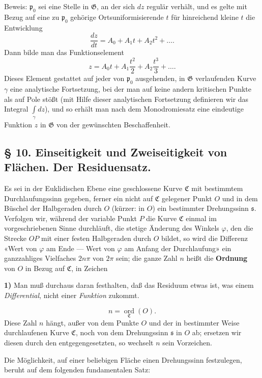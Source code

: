 \documentclass{article}
\begin{document}
Beweis: $\mathfrak{p}_0$ sei eine Stelle in $\mathfrak{G}$, an der sich $dz$ regulär verhält, und es gelte mit Bezug auf eine zu $\mathfrak{p}_0$ gehörige Ortsuniformisierende $t$ für hinreichend kleine $t$ die Entwicklung
\[ \frac{dz}{dt} = A_0 + A_1 t + A_2 t^2 + \dots. \]
Dann bilde man das Funktionselement
\[ z = A_0 t + A_1 \frac{t^2}{2} + A_2 \frac{t^3}{3} + \dots. \]
Dieses Element gestattet auf jeder von $\mathfrak{p}_0$ ausgehenden, in $\mathfrak{G}$ verlaufenden Kurve $\gamma$ eine analytische Fortsetzung, bei der man auf keine andern kritischen Punkte als auf Pole stößt (mit Hilfe dieser analytischen Fortsetzung definieren wir das Integral $\displaystyle\int\limits_\gamma dz$), und so erhält man nach dem Monodromiesatz eine eindeutige Funktion $z$ in $\mathfrak{G}$ von der gewünschten Beschaffenheit.

\subsection*{§ 10. Einseitigkeit und Zweiseitigkeit von Flächen. Der Residuensatz.}

Es sei in der Euklidischen Ebene eine geschlossene Kurve $\mathfrak{C}$ mit bestimmtem Durchlaufungssinn gegeben, ferner ein nicht auf $\mathfrak{C}$ gelegener Punkt $O$ und in dem Büschel der Halbgeraden durch $O$ (kürzer: in $O$) ein bestimmter Drehungssinn $\mathfrak{s}$. Verfolgen wir, während der variable Punkt $P$ die Kurve $\mathfrak{C}$ einmal im vorgeschriebenen Sinne durchläuft, die stetige Änderung des Winkels $\varphi$, den die Strecke $OP$ mit einer festen Halbgeraden durch $O$ bildet, so wird die Differenz
«Wert von $\varphi$ am Ende --- Wert von $\varphi$ am Anfang der Durchlaufung»
ein ganzzahliges Vielfaches $2n\pi$ von $2\pi$ sein; die ganze Zahl $n$ heißt die \textbf{Ordnung} von $O$ in Bezug auf $\mathfrak{C}$, in Zeichen

\textbf{1)} Man muß durchaus daran festhalten, daß das Residuum etwas ist, was einem \emph{Differential}, nicht einer \emph{Funktion} zukommt.

\[ n = \underset{\mathfrak{C}}{\operatorname{ord}}(O). \]
Diese Zahl $n$ hängt, außer von dem Punkte $O$ und der in bestimmter Weise durchlaufenen Kurve $\mathfrak{C}$, noch von dem Drehungssinn $\mathfrak{s}$ in $O$ ab; ersetzen wir diesen durch den entgegengesetzten, so wechselt $n$ sein Vorzeichen.

Die Möglichkeit, auf einer beliebigen Fläche einen Drehungssinn festzulegen, beruht auf dem folgenden fundamentalen Satz:
\end{document}
